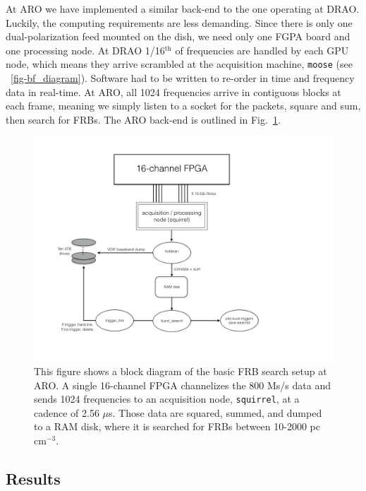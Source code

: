 At ARO we have implemented a similar back-end to the 
one operating at DRAO. Luckily, the computing 
requirements are less demanding. Since there is only 
one dual-polarization feed mounted on the dish, 
we need only one FGPA board and one processing node. 
At DRAO 1/16$^{\textrm{th}}$ of frequencies are 
handled by each GPU node, which means they arrive scrambled
at the acquisition machine, {\tt moose} (see ~\ref{fig-bf_diagram}). 
Software had to be written to re-order in time and frequency 
data in real-time. At ARO, all 1024 frequencies arrive in contiguous 
blocks at each frame, meaning we simply listen to a socket 
for the packets, square and sum, then search for FRBs. The ARO 
back-end is outlined in Fig.~\ref{fig-aro_diagram}.


\begin{figure}[!h]
\label{fig-aro_diagram}
\begin{center}
\includegraphics[trim={0in, 0in, 0in, 0in}, width=\textwidth]{./figures/beamforming/aro_diagram.jpeg}
\caption[abc]{This figure shows a block diagram of the basic 
     FRB search setup at ARO. A single 16-channel FPGA
     channelizes the 800 Ms/s data and sends 1024 frequencies 
     to an acquisition node, {\tt squirrel}, at a cadence of 2.56 $\mu$s.
     Those data are squared, summed, and dumped to a RAM disk, 
     where it is searched for FRBs between 10-2000 pc cm$^{-3}$.}
\vspace{0.4cm}   
\end{center}
\end{figure}

\subsection{Results}

